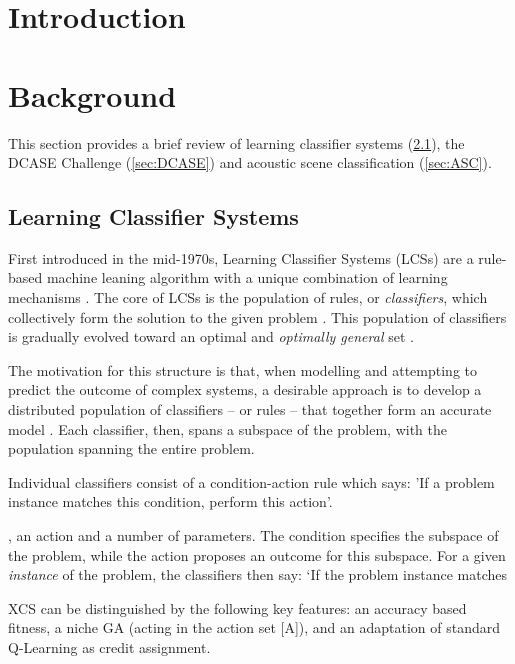 \documentclass[11pt]{article}
\begin{document}
\begin{multicols}{2}


\section{Introduction}


\lipsum[1]




\section{Background}

This section provides a brief review of learning classifier systems (\ref{sec:LCS}), the DCASE Challenge (\ref{sec:DCASE}) and acoustic scene classification (\ref{sec:ASC}).



\subsection{Learning Classifier Systems}
\label{sec:LCS}

First introduced in the mid-1970s, Learning Classifier Systems (LCSs) are a rule-based machine leaning algorithm with a unique combination of learning mechanisms \cite{Butz2015}. The core of LCSs is the population of rules, or \textit{classifiers}, which collectively form the solution to the given problem \cite{Urbanowicz2009}. This population of classifiers is gradually evolved toward an optimal and \textit{optimally general} set \cite{Urbanowicz2009}.

The motivation for this structure is that, when modelling and attempting to predict the outcome of complex systems, a desirable approach is to develop a distributed population of classifiers -- or rules -- that together form an accurate model \cite[p.~2]{Urbanowicz2009}. Each classifier, then, spans a subspace of the problem, with the population spanning the entire problem.

Individual classifiers consist of a condition-action rule which says: 'If a problem instance matches this condition, perform this action'.


, an action and a number of parameters. The condition specifies the subspace of the problem, while the action proposes an outcome for this subspace. For a given \textit{instance} of the problem, the classifiers then say: `If the problem instance matches


XCS can be distinguished by the
following key features: an accuracy based fitness, a niche
GA (acting in the action set [A]), and an adaptation of
standard Q-Learning as credit assignment.





\end{multicols}
\end{document}
